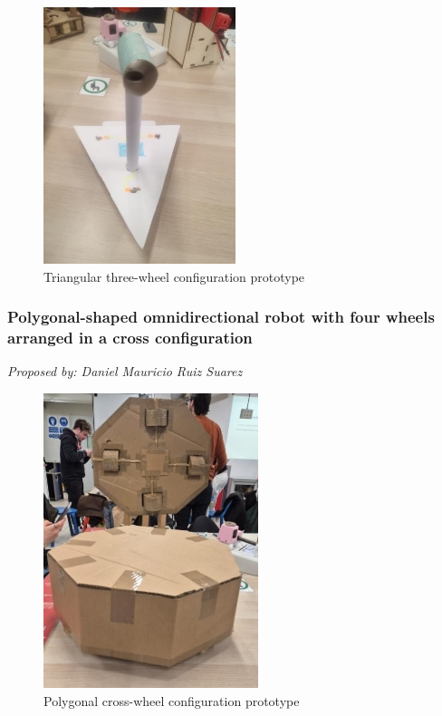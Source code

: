 \begin{figure}[H]
    \centering
    \includegraphics[width=0.6\linewidth]{../ReportMovementModule/images/Aspose.Words.728084da-df58-4b9d-a372-f65cffbdb23d.003.jpeg}
    \caption{Triangular three-wheel configuration prototype}
\end{figure}

\subsubsection{Polygonal-shaped omnidirectional robot with four wheels arranged in a cross configuration}
\textit{Proposed by: Daniel Mauricio Ruiz Suarez}

\begin{figure}[H]
    \centering
    \includegraphics[width=0.6\linewidth]{../ReportMovementModule/images/Aspose.Words.728084da-df58-4b9d-a372-f65cffbdb23d.004.jpeg}
    \caption{Polygonal cross-wheel configuration prototype}
\end{figure}

